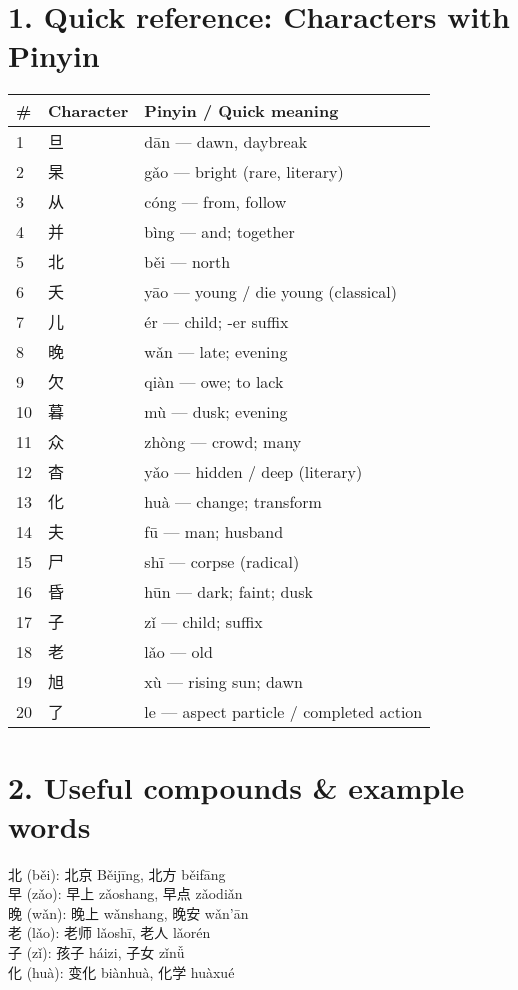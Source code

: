 
\begin{CJK}{UTF8}{gbsn}

\section*{1. Quick reference: Characters with Pinyin}
\begin{longtable}{llp{8cm}}
\toprule
\# & Character & Pinyin / Quick meaning \\
\midrule
1 & 旦 & dān — dawn, daybreak \\
2 & 杲 & gǎo — bright (rare, literary) \\
3 & 从 & cóng — from, follow \\
4 & 并 & bìng — and; together \\
5 & 北 & běi — north \\
6 & 夭 & yāo — young / die young (classical) \\
7 & 儿 & ér — child; -er suffix \\
8 & 晚 & wǎn — late; evening \\
9 & 欠 & qiàn — owe; to lack \\
10 & 暮 & mù — dusk; evening \\
11 & 众 & zhòng — crowd; many \\
12 & 杳 & yǎo — hidden / deep (literary) \\
13 & 化 & huà — change; transform \\
14 & 夫 & fū — man; husband \\
15 & 尸 & shī — corpse (radical) \\
16 & 昏 & hūn — dark; faint; dusk \\
17 & 子 & zǐ — child; suffix \\
18 & 老 & lǎo — old \\
19 & 旭 & xù — rising sun; dawn \\
20 & 了 & le — aspect particle / completed action \\
\bottomrule
\end{longtable}

\section*{2. Useful compounds \& example words}
北 (běi): 北京 Běijīng, 北方 běifāng \\
早 (zǎo): 早上 zǎoshang, 早点 zǎodiǎn \\
晚 (wǎn): 晚上 wǎnshang, 晚安 wǎn'ān \\
老 (lǎo): 老师 lǎoshī, 老人 lǎorén \\
子 (zǐ): 孩子 háizi, 子女 zǐnǚ \\
化 (huà): 变化 biànhuà, 化学 huàxué


\end{CJK}
